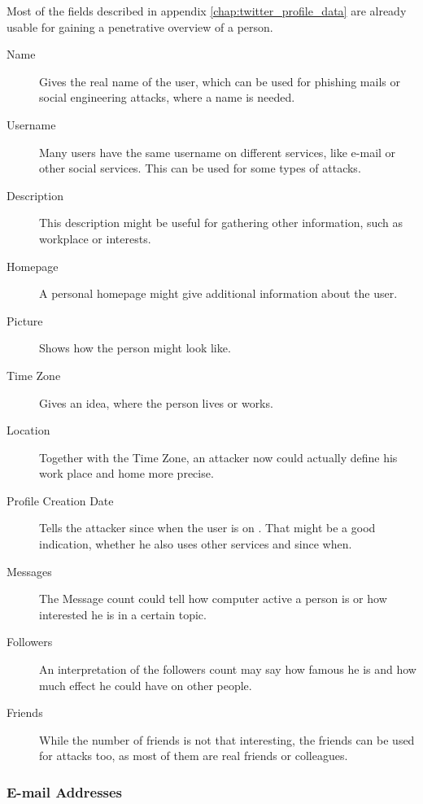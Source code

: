 Most of the fields described in appendix \ref{chap:twitter_profile_data} are
already usable for gaining a penetrative overview of a person.

\begin{description}
\item[Name] Gives the real name of the user, which can be used for
phishing mails or social engineering attacks, where a name is needed.

\item[Username] Many users have the same username on different
services, like e-mail or other social services. This can be used for some types
of attacks.

\item[Description] This description might be useful for gathering other
information, such as workplace or interests.

\item[Homepage] A personal homepage might give additional information about the
user.

\item[Picture] Shows how the person might look like.

\item[Time Zone] Gives an idea, where the person lives or works.

\item[Location] Together with the Time Zone, an attacker now could actually
define his work place and home more precise.

\item[Profile Creation Date] Tells the attacker since when the user is on
\Twitter{}. That might be a good indication, whether he also uses other
services and since when.

\item[Messages] The Message count could tell how computer active a person is or
how interested he is in a certain topic.

\item[Followers] An interpretation of the followers count may say how famous he
is and how much effect he could have on other people.

\item[Friends] While the number of friends is not that interesting,
the friends can be used for attacks too, as most of them are real friends
or colleagues.
\end{description}

\subsubsection{E-mail Addresses}

